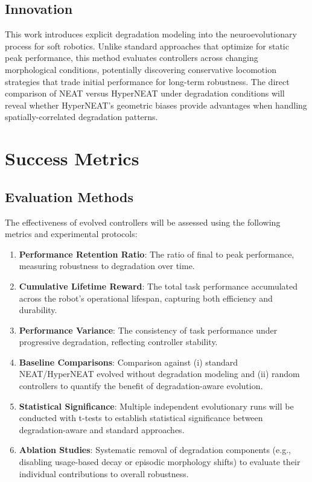 \documentclass[journal,12pt,onecolumn]{IEEEtran}
\begin{document}
\subsection{Innovation}
This work introduces explicit degradation modeling into the neuroevolutionary process for soft robotics. Unlike standard approaches that optimize for static peak performance, this method evaluates controllers across changing morphological conditions, potentially discovering conservative locomotion strategies that trade initial performance for long-term robustness. The direct comparison of NEAT versus HyperNEAT under degradation conditions will reveal whether HyperNEAT's geometric biases provide advantages when handling spatially-correlated degradation patterns.

\section{Success Metrics}

\subsection{Evaluation Methods}
The effectiveness of evolved controllers will be assessed using the following metrics and experimental protocols:

\begin{enumerate}
    \item \textbf{Performance Retention Ratio}: The ratio of final to peak performance, measuring robustness to degradation over time.
    \item \textbf{Cumulative Lifetime Reward}: The total task performance accumulated across the robot’s operational lifespan, capturing both efficiency and durability.
    \item \textbf{Performance Variance}: The consistency of task performance under progressive degradation, reflecting controller stability.
    \item \textbf{Baseline Comparisons}: Comparison against (i) standard NEAT/HyperNEAT evolved without degradation modeling and (ii) random controllers to quantify the benefit of degradation-aware evolution.
    \item \textbf{Statistical Significance}: Multiple independent evolutionary runs will be conducted with t-tests to establish statistical significance between degradation-aware and standard approaches.
    \item \textbf{Ablation Studies}: Systematic removal of degradation components (e.g., disabling usage-based decay or episodic morphology shifts) to evaluate their individual contributions to overall robustness.
\end{enumerate}
\end{document}
